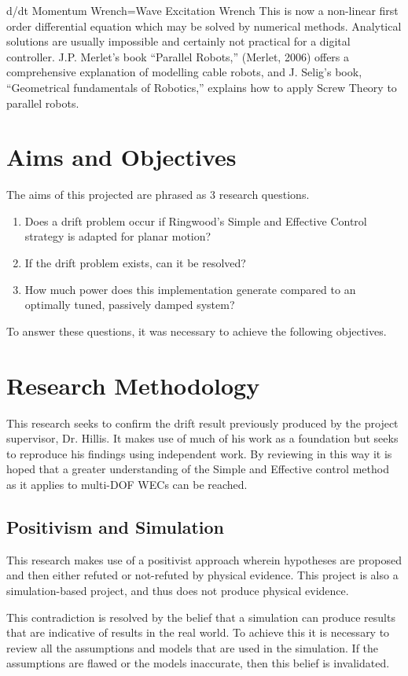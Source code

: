 \documentclass{report}
\begin{document}
d/dt Momentum Wrench=Wave Excitation Wrench
This is now a non-linear first order differential equation which may be solved by numerical methods. Analytical solutions are usually impossible and certainly not practical for a digital controller.
J.P. Merlet’s book “Parallel Robots,” (Merlet, 2006) offers a comprehensive explanation of modelling cable robots, and J. Selig’s book, “Geometrical fundamentals of Robotics,” explains how to apply Screw Theory to parallel robots.

\chapter{Aims and Objectives}
The aims of this projected are phrased as 3 research questions.
\begin{enumerate}
\item{Does a drift problem occur if Ringwood's Simple and Effective Control strategy is adapted for planar motion?}
\item{If the drift problem exists, can it be resolved?}
\item{How much power does this implementation generate compared to an optimally tuned, passively damped system?}
\end{enumerate}

To answer these questions, it was necessary to achieve the following objectives.



\chapter{Research Methodology}
This research seeks to confirm the drift result previously produced by the project supervisor, Dr. Hillis. It makes use of much of his work as a foundation but seeks to reproduce his findings using independent work. By reviewing in this way it is hoped that a greater understanding of the Simple and Effective control method as it applies to multi-DOF WECs can be reached.

\section{Positivism and Simulation}
This research makes use of a positivist approach wherein hypotheses are proposed and then either refuted or not-refuted by physical evidence. This project is also a simulation-based project, and thus does not produce physical evidence.

This contradiction is resolved by the belief that a simulation can produce results that are indicative of results in the real world. To achieve this it is necessary to review all the assumptions and models that are used in the simulation. If the assumptions are flawed or the models inaccurate, then this belief is invalidated. 
\end{document}
